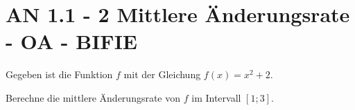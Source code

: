 \section{AN 1.1 - 2 Mittlere Änderungsrate - OA - BIFIE}

\begin{beispiel}[AN 1.1]{1} %
Gegeben ist die Funktion $f$ mit der Gleichung $f(x)=x^2+2$.

\leer

Berechne die mittlere Änderungsrate von $f$ im Intervall $[1;3]$.

\end{beispiel}